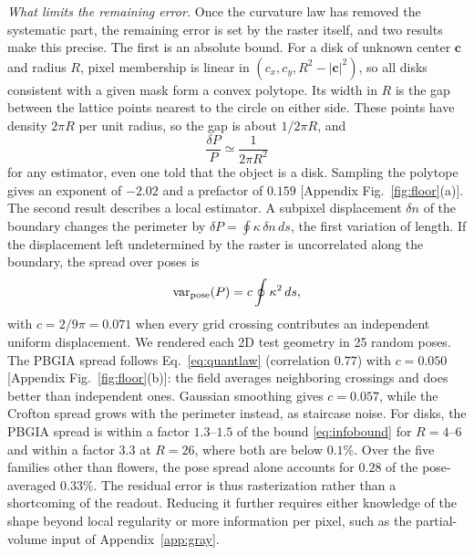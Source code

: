\documentclass[11pt,a4paper]{article}
\begin{document}
\emph{What limits the remaining error.} Once the curvature law has removed the systematic part, the remaining error is set by the raster itself, and two results make this precise. The first is an absolute bound. For a disk of unknown center $\bm c$ and radius $R$, pixel membership is linear in $(c_x,c_y,R^2-|\bm c|^2)$, so all disks consistent with a given mask form a convex polytope. Its width in $R$ is the gap between the lattice points nearest to the circle on either side. These points have density $2\pi R$ per unit radius, so the gap is about $1/2\pi R$, and
\begin{equation}
\frac{\delta P}{P}\simeq\frac{1}{2\pi R^{2}}
\label{eq:infobound}
\end{equation}
for any estimator, even one told that the object is a disk. Sampling the polytope gives an exponent of $-2.02$ and a prefactor of $0.159$ [Appendix Fig.~\ref{fig:floor}(a)]. The second result describes a local estimator. A subpixel displacement $\delta n$ of the boundary changes the perimeter by $\delta P=\oint\kappa\,\delta n\,ds$, the first variation of length. If the displacement left undetermined by the raster is uncorrelated along the boundary, the spread over poses is
\begin{equation}
\mathrm{var}_{\rm pose}(P)=c\oint\kappa^{2}\,ds,
\label{eq:quantlaw}
\end{equation}
with $c=2/9\pi=0.071$ when every grid crossing contributes an independent uniform displacement. We rendered each 2D test geometry in 25 random poses. The PBGIA spread follows Eq.~\eqref{eq:quantlaw} (correlation $0.77$) with $c=0.050$ [Appendix Fig.~\ref{fig:floor}(b)]: the field averages neighboring crossings and does better than independent ones. Gaussian smoothing gives $c=0.057$, while the Crofton spread grows with the perimeter instead, as staircase noise. For disks, the PBGIA spread is within a factor $1.3$--$1.5$ of the bound \eqref{eq:infobound} for $R=4$--$6$ and within a factor $3.3$ at $R=26$, where both are below $0.1\%$. Over the five families other than flowers, the pose spread alone accounts for $0.28$ of the pose-averaged $0.33\%$. The residual error is thus rasterization rather than a shortcoming of the readout. Reducing it further requires either knowledge of the shape beyond local regularity or more information per pixel, such as the partial-volume input of Appendix~\ref{app:gray}.
\end{document}
